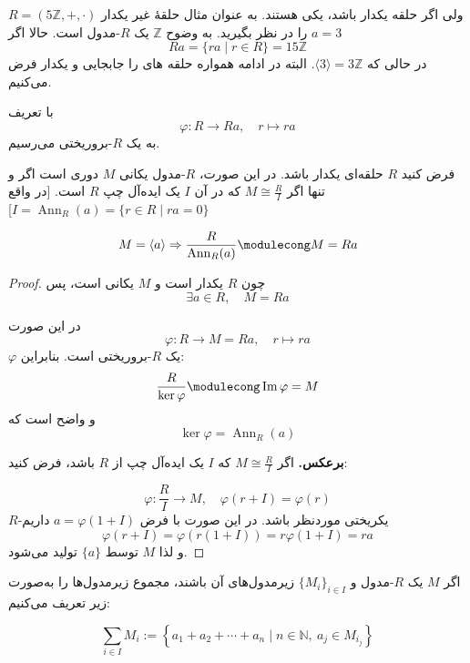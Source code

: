 ولی اگر حلقه
یکدار باشد،‌ یکی هستند.
به عنوان مثال حلقهٔ غیر یکدار
\(R = (5\mathbb{Z}, +, \cdot)\)
را در نظر بگیرید.
به وضوح
\(\mathbb{Z}\)
یک
\(R\)-مدول
است. حالا اگر
\(a = 3\)
\[
    Ra = \{ ra \mid r \in R \} = 15\mathbb{Z}
\]
در حالی که
\(\langle 3 \rangle = 3 \mathbb{Z}\). البته در ادامه همواره حلقه های را جابجایی و یکدار فرض می‌کنیم.


\begin{remark}
    با
    تعریف
    \[
        \varphi : R \to Ra, \quad r \mapsto ra
    \]
    به یک
    $R$-بروریختی
    می‌رسیم.

\end{remark}


\begin{theorem}
    فرض کنید $R$ حلقه‌ای یکدار باشد. در این صورت،
    \(R\)-مدول
    یکانی
    \(M\)
    دوری است اگر و تنها اگر
    \(M \cong \frac{R}{I}\)
    که در آن
    \(I\)
    یک ایده‌آل چپ
    \(R\)
    است.
    [در واقع \(I = \operatorname{Ann}_R(a) = \{ r \in R \mid ra = 0 \}\)]
\end{theorem}

\[
    M = \langle a \rangle \Rightarrow \frac{R}{\operatorname{Ann}_R(a)} \modulecong M = Ra
\]

\begin{proof}
    چون $R$ یکدار است و $M$ یکانی است، پس
    \[
        \exists a \in R,\quad M = Ra
    \]

    در این صورت
    \[
        \varphi : R \longrightarrow M = Ra, \quad r \longmapsto ra
    \]
    $\varphi$ یک $R$-بروریختی  است. بنابراین:
    \[
        \frac{R}{\ker \varphi} \modulecong \operatorname{Im} \varphi = M
    \]
    و واضح است که
    \[
        \ker \varphi = \operatorname{Ann}_R(a)
    \]

    \textbf{برعکس.}
    اگر $M \cong \frac{R}{I}$ که $I$ یک ایده‌آل چپ از $R$ باشد، فرض کنید:

    \[
        \varphi : \frac{R}{I} \longrightarrow M, \quad \varphi(r + I) = \varphi(r)
    \]
    $R$-یکریختی
    موردنظر باشد.
    در این صورت با فرض $a = \varphi(1 + I)$ داریم
    \[
        \varphi(r + I) = \varphi(r(1 + I)) = r \varphi(1 + I) = ra
    \]
    و لذا $M$ توسط $\{a\}$ تولید می‌شود.

\end{proof}

\begin{definition}
    اگر $M$ یک $R$-مدول و $\{M_i\}_{i \in I}$ زیرمدول‌های آن باشند، مجموع زیرمدول‌ها را به‌صورت زیر تعریف می‌کنیم:

    \[
        \sum_{i \in I} M_i := \left\{ a_1 + a_2 + \cdots + a_n \mid n \in \mathbb{N},\ a_j \in M_{i_j} \right\}
    \]



\end{definition}

